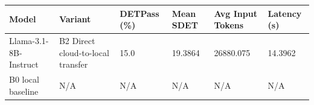 \begin{tabular}{llllll}
\toprule
Model & Variant & DETPass (\%) & Mean SDET & Avg Input Tokens & Latency (s) \\
\midrule
Llama-3.1-8B-Instruct & B2 Direct cloud-to-local transfer & 15.0 & 19.3864 & 26880.075 & 14.3962 \\
B0 local baseline & N/A & N/A & N/A & N/A & N/A \\
\bottomrule
\end{tabular}
